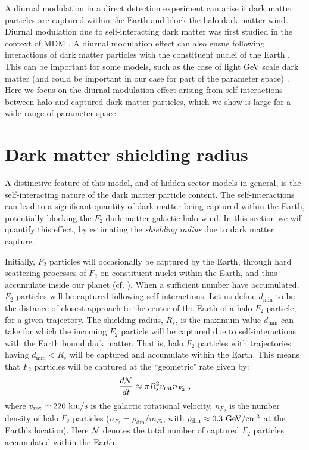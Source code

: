\documentclass[12pt]{article}
\begin{document}
A diurnal modulation in a direct detection experiment can arise if dark matter particles are captured within the Earth and block the halo dark matter wind. Diurnal modulation due to self-interacting dark matter was first studied in the context of MDM \cite{footdiurnal}. A diurnal modulation effect can also ensue following interactions of dark matter particles with the constituent nuclei of the Earth \cite{collar}. This can be important for some models, such as the case of light GeV scale dark matter (and could be important in our case for part of the parameter space) \cite{shoemaker}. Here we focus on the diurnal modulation effect arising from self-interactions between halo and captured dark matter particles, which we show is large for a wide range of parameter space.

\section{Dark matter shielding radius}

A distinctive feature of this model, and of hidden sector models in general, is the self-interacting nature of the dark matter particle content. The self-interactions can lead to a significant quantity of dark matter being captured within the Earth, potentially blocking the $F_2$ dark matter galactic halo wind. In this section we will quantify this effect, by estimating the \textit{shielding radius} due to dark matter capture.

Initially, $F_2$ particles will occasionally be captured by the Earth, through hard scattering processes of $F_2$ on constituent nuclei within the Earth, and thus accumulate inside our planet (cf. \cite{foot94}). When a sufficient number have accumulated, $F_2$ particles will be captured following self-interactions. Let us define $d _{\min}$ to be the distance of closest approach to the center of the Earth of a halo $F_2$ particle, for a given trajectory. The shielding radius, $R_s$, is the maximum value $d _{\min}$ can take for which the incoming $F_2$ particle will be captured due to self-interactions with the Earth bound dark matter. That is, halo $F_2$ particles with trajectories having $d _{\min}<R _s$ will be captured and accumulate within the Earth.
This means that $F_2$ particles will be captured at the ``geometric" rate given by:
%
\begin{eqnarray}
\frac{d{\cal N}}{dt} \approx \pi R _s ^2v _{\text{rot}}n _{F_2} \ ,
\end{eqnarray}
%
where $v _{\text{rot}} \simeq 220 \ \rm km/s$ is the galactic rotational velocity, $n _{F_2}$ is the number density of halo $F_2$ particles ($n _{F_2} = \rho _{\text{dm}}/m _{F_2}$, with $\rho _{\text{dm}} \approx 0.3 \ \rm GeV/cm ^3$ at the Earth's location). Here ${\cal N}$ denotes the total number of captured $F_2$ particles accumulated within the Earth.
\end{document}
